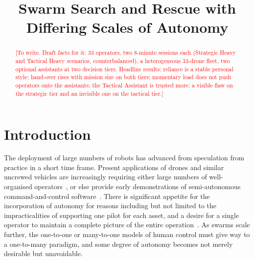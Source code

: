 \documentclass[10pt]{article}
\title{Swarm Search and Rescue with Differing Scales of Autonomy}
\author{}
\date{}
\theoremstyle{definition}
\newcommand{\todo}[1]{\textcolor{red}{[#1]}}
\begin{document}
\maketitle

\begin{abstract}
\todo{To write. Draft facts for it: 33 operators, two 8-minute sessions each (Strategic Heavy and Tactical Heavy
scenarios, counterbalanced), a heterogeneous 33-drone fleet, two optional assistants at two decision tiers. Headline
results: reliance is a stable personal style; hand-over rises with mission size on both tiers; momentary load does not
push operators onto the assistants; the Tactical Assistant is trusted more; a visible flaw on the strategic tier and an
invisible one on the tactical tier.}
\end{abstract}

\section{Introduction}\label{sec:intro}

The deployment of large numbers of robots has advanced from speculation from practice in a short time frame. Present applications of drones and similar uncrewed vehicles are increasingly requiring either large numbers of well-organised operators~\cite{ramchurn2016disaster}, or else provide early demonstrations of semi-autonomous command-and-control software~\cite{anduril2023lattice}. There is significant appetite for the incorporation of autonomy for reasons including but not limited to the impracticalities of supporting one pilot for each asset, and a desire for a single operator to maintain a complete picture of the entire operation~\cite{mod2022ukairpower}. As swarms scale further, the one-to-one or many-to-one models of human control must give way to a one-to-many paradigm, and some degree of autonomy becomes not merely desirable but unavoidable.
\end{document}
